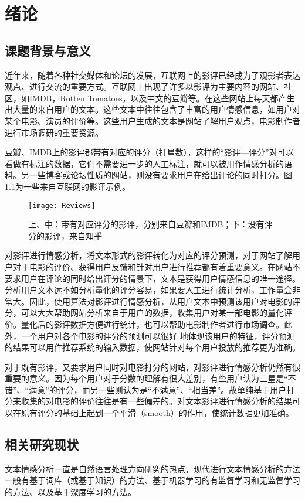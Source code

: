 \chapter{绪论}

\section{课题背景与意义}
近年来，随着各种社交媒体和论坛的发展，互联网上的影评已经成为了观影者表达观点、进行交流的重要方式。互联网上出现了许多以影评为主要内容的网站、社区，如IMDB，Rotten Tomatoes，以及中文的豆瓣等。在这些网站上每天都产生出大量的来自用户的文本。这些文本中往往包含了丰富的用户情感信息，如用户对某个电影、演员的评价等。这些用户生成的文本是网站了解用户观点，电影制作者进行市场调研的重要资源。

豆瓣、IMDB上的影评都带有对应的评分（打星数），这样的“影评—评分”对可以看做有标注的数据，它们不需要进一步的人工标注，就可以被用作情感分析的语料。另一些博客或论坛性质的网站，则没有要求用户在给出评论的同时打分。图1.1为一些来自互联网的影评示例。
\begin{figure}[ht]
\centering
\texttt{[image: Reviews]}
\caption{上、中：带有对应评分的影评，分别来自豆瓣和IMDB；下：没有评分的影评，来自知乎} \label{fig:Reviews}
\end{figure}

对影评进行情感分析，将文本形式的影评转化为对应的评分预测，对于网站了解用户对于电影的评价、获得用户反馈和针对用户进行推荐都有着重要意义。在网站不要求用户在评论的同时给出评分的情景下，文本是获得用户情感信息的唯一途径。分析用户文本远不如分析量化的评分容易，如果要人工进行统计分析，工作量会非常大。因此，使用算法对影评进行情感分析，从用户文本中预测该用户对电影的评分，可以大大帮助网站分析来自于用户的数据，收集用户对某一部电影的量化评价。量化后的影评数据方便进行统计，也可以帮助电影制作者进行市场调查。此外，一个用户对各个电影的评分的预测可以很好 地体现该用户的特征，评分预测的结果可以用作推荐系统的输入数据，使网站针对每个用户投放的推荐更为准确。

对于既有影评，又要求用户同时对电影打分的网站，对影评进行情感分析仍然有很重要的意义。因为每个用户对于分数的理解有很大差别，有些用户认为三星是“不错”、“满意”的评分，而另一些则认为是“不满意”、“相当差”。故单纯基于用户打分来收集的对电影的评价往往是有一些偏差的。对文本影评进行情感分析的结果可以在原有评分的基础上起到一个平滑（smooth）的作用，使统计数据更加准确。



\section{相关研究现状}
文本情感分析一直是自然语言处理方向研究的热点，现代进行文本情感分析的方法一般有基于词库（或基于知识）的方法、基于机器学习的有监督学习和无监督学习的方法、以及基于深度学习的方法。

